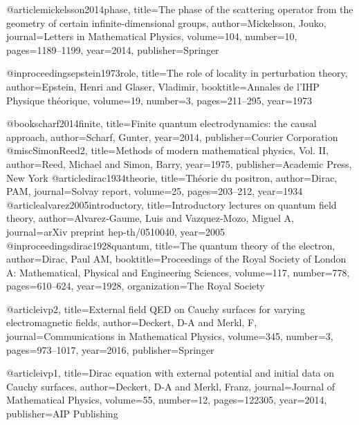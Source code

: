 





@article{mickelsson2014phase,
  title={The phase of the scattering operator from the geometry of certain infinite-dimensional groups},
  author={Mickelsson, Jouko},
  journal={Letters in Mathematical Physics},
  volume={104},
  number={10},
  pages={1189--1199},
  year={2014},
  publisher={Springer}
}

@inproceedings{epstein1973role,
  title={The role of locality in perturbation theory},
  author={Epstein, Henri and Glaser, Vladimir},
  booktitle={Annales de l'IHP Physique th{\'e}orique},
  volume={19},
  number={3},
  pages={211--295},
  year={1973}
}

@book{scharf2014finite,
  title={Finite quantum electrodynamics: the causal approach},
  author={Scharf, Gunter},
  year={2014},
  publisher={Courier Corporation}
}
@misc{SimonReed2,
  title={Methods of modern mathematical physics, Vol. II},
  author={Reed, Michael and Simon, Barry},
  year={1975},
  publisher={Academic Press, New York}
}
@article{dirac1934theorie,
  title={Th{\'e}orie du positron},
  author={Dirac, PAM},
  journal={Solvay report},
  volume={25},
  pages={203--212},
  year={1934}
}
@article{alvarez2005introductory,
  title={Introductory lectures on quantum field theory},
  author={Alvarez-Gaume, Luis and Vazquez-Mozo, Miguel A},
  journal={arXiv preprint hep-th/0510040},
  year={2005}
}
@inproceedings{dirac1928quantum,
  title={The quantum theory of the electron},
  author={Dirac, Paul AM},
  booktitle={Proceedings of the Royal Society of London A: Mathematical, Physical and Engineering Sciences},
  volume={117},
  number={778},
  pages={610--624},
  year={1928},
  organization={The Royal Society}
}

@article{ivp2,
  title={External field QED on Cauchy surfaces for varying electromagnetic fields},
  author={Deckert, D-A and Merkl, F},
  journal={Communications in Mathematical Physics},
  volume={345},
  number={3},
  pages={973--1017},
  year={2016},
  publisher={Springer}
}


@article{ivp1,
  title={Dirac equation with external potential and initial data on Cauchy surfaces},
  author={Deckert, D-A and Merkl, Franz},
  journal={Journal of Mathematical Physics},
  volume={55},
  number={12},
  pages={122305},
  year={2014},
  publisher={AIP Publishing}
}

